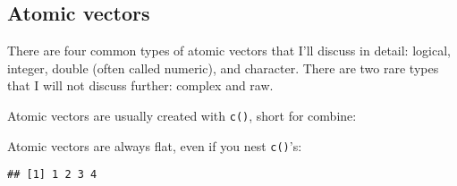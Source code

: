 \hypertarget{atomic-vectors}{%
\subsection{Atomic vectors}\label{atomic-vectors}}

There are four common types of atomic vectors that I'll discuss in
detail: logical, integer, double (often called numeric), and character.
There are two rare types that I will not discuss further: complex and
raw.  

Atomic vectors are usually created with \texttt{c()}, short for combine:

\begin{Shaded}
\begin{Highlighting}[]
\StringTok{ }\NormalTok{(}\NormalTok{, }\NormalTok{, }\NormalTok{)}
\StringTok{ }
\StringTok{ }\NormalTok{(}\NormalTok{, }
\StringTok{ }\NormalTok{(}\NormalTok{, }\NormalTok{)}
\end{Highlighting}
\end{Shaded}

Atomic vectors are always flat, even if you nest \texttt{c()}'s:

\begin{Shaded}
\begin{Highlighting}[]
\NormalTok{(}\NormalTok{, }\NormalTok{(}\NormalTok{, }\NormalTok{(}\NormalTok{, }\NormalTok{)))}
\end{Highlighting}
\end{Shaded}

\begin{verbatim}
## [1] 1 2 3 4
\end{verbatim}

\begin{Shaded}
\begin{Highlighting}[]
\NormalTok{(}\NormalTok{, }\NormalTok{, }\NormalTok{, }\NormalTok{)}
\end{Highlighting}
\end{Shaded}

